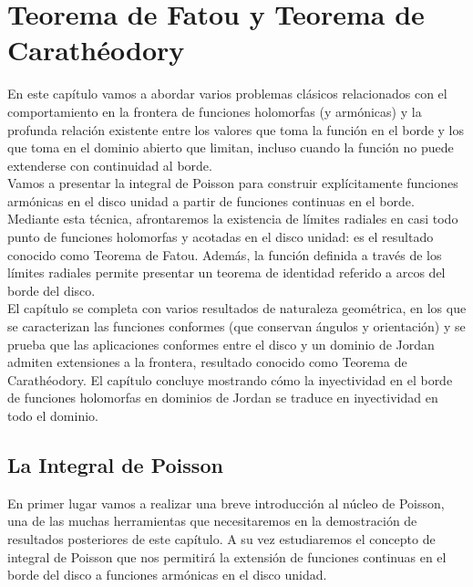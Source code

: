 \chapter{Teorema de Fatou y Teorema de Carathéodory}
\label{cap:fatou}

En este capítulo vamos a abordar varios problemas clásicos relacionados con el comportamiento en la frontera de funciones holomorfas (y armónicas) y la profunda relación existente entre los valores que toma la función en el borde y los que toma en el dominio abierto que limitan, incluso cuando la función no puede extenderse con continuidad al borde. \\

Vamos a presentar la integral de Poisson para construir explícitamente funciones armónicas en el disco unidad a partir de funciones continuas en el borde. Mediante esta técnica, afrontaremos la existencia de límites radiales en casi todo punto de funciones holomorfas y acotadas en el disco unidad: es el resultado conocido como Teorema de Fatou. Además, la función definida a través de los límites radiales permite presentar un teorema de identidad referido a arcos del borde del disco. \\

El capítulo se completa con varios resultados de naturaleza geométrica, en los que se caracterizan las funciones conformes (que conservan ángulos y orientación) y se prueba que las aplicaciones conformes entre el disco y un dominio de Jordan admiten extensiones a la frontera, resultado conocido como Teorema de Carathéodory. El capítulo concluye mostrando cómo la inyectividad en el borde de funciones holomorfas en dominios de Jordan se traduce en inyectividad en todo el dominio. \\

\section{La Integral de Poisson}

En primer lugar vamos a realizar una breve introducción al núcleo de Poisson, una de las muchas herramientas que necesitaremos en la demostración de resultados posteriores de este capítulo. A su vez estudiaremos el concepto de integral de Poisson que nos permitirá la extensión de funciones continuas en el borde del disco a funciones armónicas en el disco unidad.

